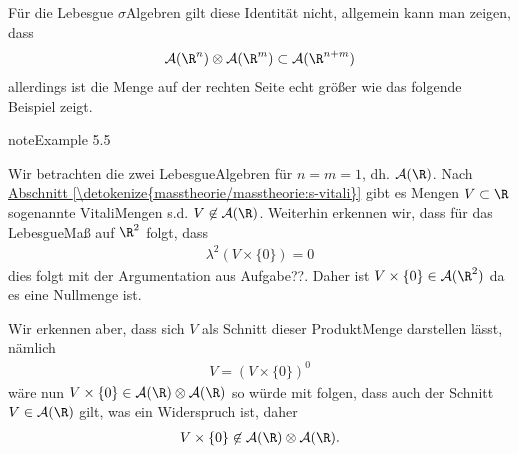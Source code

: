\documentclass[letterpaper,10pt,german]{jupyterBook}
\begin{document}
\sphinxAtStartPar
Für die Lebesgue \(\sigma\)\sphinxhyphen{}Algebren gilt diese Identität nicht, allgemein kann man zeigen, dass
\begin{equation*}
\begin{split}\mathcal{A}(\R^n)\otimes\mathcal{A}(\R^m)\subset \mathcal{A}(\R^{n+m})\end{split}
\end{equation*}
\sphinxAtStartPar
allerdings ist die Menge auf der rechten Seite echt größer wie das folgende Beispiel zeigt.
\label{masstheorie/integrationstechnik:ex:prodsig}
\begin{sphinxadmonition}{note}{Example 5.5}



\sphinxAtStartPar
Wir betrachten die zwei Lebesgue\sphinxhyphen{}Algebren für \(n=m=1\), dh. \(\mathcal{A}(\R)\). Nach \hyperref[\detokenize{masstheorie/masstheorie:s-vitali}]{Abschnitt \ref{\detokenize{masstheorie/masstheorie:s-vitali}}} gibt es Mengen \(V\subset\R\) sogenannte Vitali\sphinxhyphen{}Mengen s.d. \(V\not\in\mathcal{A}(\R)\). Weiterhin erkennen wir, dass für das Lebesgue\sphinxhyphen{}Maß auf \(\R^2\) folgt, dass
\begin{equation*}
\begin{split}\lambda^{2}(V\times\{0\}) = 0\end{split}
\end{equation*}
\sphinxAtStartPar
dies folgt mit der Argumentation aus Aufgabe??. Daher ist \(V\times\{0\}\in \mathcal{A}(\R^2)\) da es eine Nullmenge ist.

\sphinxAtStartPar
Wir erkennen aber, dass sich \(V\) als Schnitt dieser Produkt\sphinxhyphen{}Menge darstellen lässt, nämlich
\begin{equation*}
\begin{split}V = (V\times\{0\})^0\end{split}
\end{equation*}
\sphinxAtStartPar
wäre nun \(V\times\{0\}\in \mathcal{A}(\R)\otimes\mathcal{A}(\R)\) so würde mit {\hyperref[\detokenize{masstheorie/integrationstechnik:lem:secmeasure}]{}} folgen, dass auch der Schnitt \(V\in\mathcal{A}(\R)\) gilt, was ein Widerspruch ist, daher
\begin{equation*}
\begin{split}V\times\{0\} \not\in  \mathcal{A}(\R)\otimes\mathcal{A}(\R).\end{split}
\end{equation*}\end{sphinxadmonition}
\end{document}
